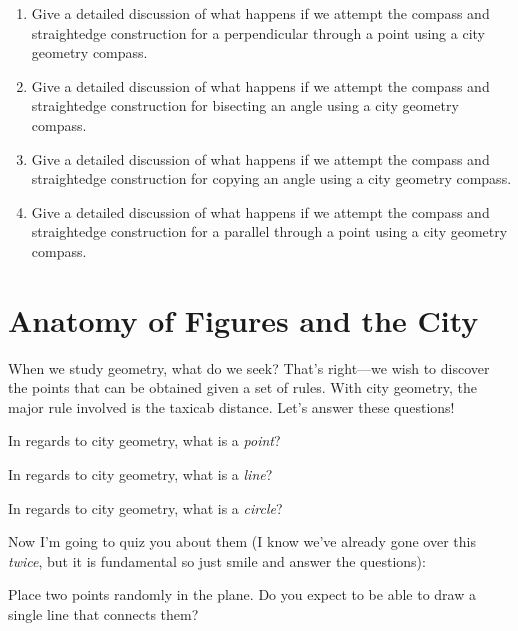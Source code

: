 \begin{enumerate}
\item Give a detailed discussion of what happens if we attempt the
  compass and straightedge construction for a perpendicular through a
  point using a city geometry compass.

\item Give a detailed discussion of what happens if we attempt the
  compass and straightedge construction for bisecting an angle using a
  city geometry compass.

\item Give a detailed discussion of what happens if we attempt the
  compass and straightedge construction for copying an angle using a
  city geometry compass.

\item Give a detailed discussion of what happens if we attempt the
  compass and straightedge construction for a parallel through a point
  using a city geometry compass.
\end{enumerate}

\newpage








\section{Anatomy of Figures and the City}

When we study geometry, what do we seek? That's right---we wish to
discover the points that can be obtained given a set of rules. With
city geometry, the major rule involved is the taxicab distance. Let's
answer these questions!

\begin{ques} 
In regards to city geometry, what is a \textit{point}?
\end{ques}
\QM

\begin{ques}
In regards to city geometry, what is a \textit{line}?
\end{ques}
\QM


\begin{ques}
In regards to city geometry, what is a \textit{circle}?
\end{ques}
\QM


Now I'm going to quiz you about them (I know we've already gone over
this \textit{twice}, but it is fundamental so just smile and answer
the questions):

\begin{ques} 
Place two points randomly in the plane. Do you expect to be able to
draw a single line that connects them?
\end{ques}
\QM

